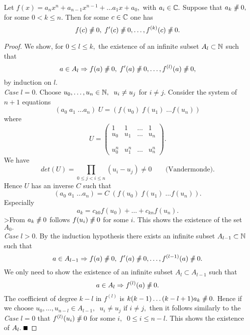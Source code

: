 {\begin{lemma}\label{1.6} Let $f(x) = a_nx^n+a_{n-1}x^{n-1}+\ldots
a_1x+a_0,$ with $a_i 
\in\mathbb{C}.$  Suppose that $a_k\unneq 0,$ for some $0<k\leq n.$ Then for
some $c\in\mathbb{C}$ one has
$$f(c)\unneq 0,\;f'(c)\unneq 0,\ldots,f^{(k)}(c)\unneq 0.$$
\end{lemma}
\begin{proof}
We show, for $0\leq l\leq k,$ the existence of an infinite subset
$A_l\subset\mathbb{N}$ such that
$$a\in A_l\Rightarrow f(a)\unneq 0,\;f'(a)\unneq
0,\ldots,f^{(l)}(a)\unneq 0,$$
by induction on $l.$\\[1ex]
{\em Case }$l=0.$ Choose $u_0,\ldots,u_n\in\mathbb{N},\;\; u_i\neq u_j$ for
$i\neq j.$ Consider the system of $n+1$ equations
$$ (a_0\; a_1\;\ldots a_n)\;U =(f(u_0)\; f(u_1)\;\ldots f(u_n))$$
where
$$ U =
\left(
\begin{array}{llll}
1 &1 &\ldots &1 \\
u_0 &u_1 &\ldots &u_n \\
&&& \\
&&& \\
u_0^n &u_1^n &\ldots &u_n^n
\end{array}
\right).$$
We have
$$det(U) = \prod\limits_{0\leq j < i\leq n}(u_i - u_j)\neq 0\quad\quad\mbox{(Vandermonde)}.$$
Hence $U$ has an inverse $C$ such that 
$$ (a_0\; a_1\;\ldots a_n) = C\;(f(u_0)\; f(u_1)\;\ldots f(u_n)).$$
Especially
$$a_k = c_{k0}f(u_0)+\ldots +c_{kn}f(u_n).$$
>From $a_k\unneq 0$ follows $f(u_i)\unneq 0$ for some $i.$ This shows
the existence of the set $A_0.$\\[1ex]
{\em Case }$l>0.$ By the induction hypothesis there exists an infinite
subset $A_{l-1}\subset\mathbb{N}$ such that
$$a\in A_{l-1}\Rightarrow f(a)\unneq 0,\;f'(a)\unneq
0,\ldots,f^{(l-1)}(a)\unneq 0.$$
We only need to show the existence of an infinite subset $A_l\subset
A_{l-1}$ such that
$$a\in A_l\Rightarrow f^{(l)}(a)\unneq 0.$$
The coefficient of degree $k-l$ in $f^{(l)}$ is
$k(k-1)\ldots(k-l+1)a_k\unneq 0.$ Hence if we choose
$u_0,\ldots,u_{n-l}\in A_{l-1},\;\; u_i\neq u_j \mbox{ if } i\neq j,$
then it follows similarly to the {\em Case }$l=0$ that
$f^{(l)}(u_i)\unneq 0$ for some $i,\;\; 0\leq i \leq n-l.$ This shows
the existence of $A_l.\hfill\qed$
\end{proof}
}

